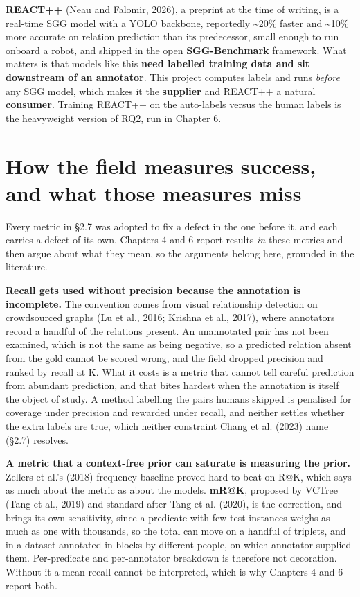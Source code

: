 \textbf{REACT++} (Neau and Falomir, 2026), a preprint at the time of writing, is a real-time SGG model with a YOLO backbone, reportedly \textasciitilde{}20\% faster and \textasciitilde{}10\% more accurate on relation prediction than its predecessor, small enough to run onboard a robot, and shipped in the open \textbf{SGG-Benchmark} framework. What matters is that models like this \textbf{need labelled training data and sit downstream of an annotator}. This project computes labels and runs \textit{before} any SGG model, which makes it the \textbf{supplier} and REACT++ a natural \textbf{consumer}. Training REACT++ on the auto-labels versus the human labels is the heavyweight version of RQ2, run in Chapter 6.

\section{How the field measures success, and what those measures miss}

Every metric in \S{}2.7 was adopted to fix a defect in the one before it, and each carries a defect of its own. Chapters 4 and 6 report results \textit{in} these metrics and then argue about what they mean, so the arguments belong here, grounded in the literature.

\textbf{Recall gets used without precision because the annotation is incomplete.} The convention comes from visual relationship detection on crowdsourced graphs (Lu et al., 2016; Krishna et al., 2017), where annotators record a handful of the relations present. An unannotated pair has not been examined, which is not the same as being negative, so a predicted relation absent from the gold cannot be scored wrong, and the field dropped precision and ranked by recall at K. What it costs is a metric that cannot tell careful prediction from abundant prediction, and that bites hardest when the annotation is itself the object of study. A method labelling the pairs humans skipped is penalised for coverage under precision and rewarded under recall, and neither settles whether the extra labels are true, which neither constraint Chang et al. (2023) name (\S{}2.7) resolves.

\textbf{A metric that a context-free prior can saturate is measuring the prior.} Zellers et al.'s (2018) frequency baseline proved hard to beat on R@K, which says as much about the metric as about the models. \textbf{mR@K}, proposed by VCTree (Tang et al., 2019) and standard after Tang et al. (2020), is the correction, and brings its own sensitivity, since a predicate with few test instances weighs as much as one with thousands, so the total can move on a handful of triplets, and in a dataset annotated in blocks by different people, on which annotator supplied them. Per-predicate and per-annotator breakdown is therefore not decoration. Without it a mean recall cannot be interpreted, which is why Chapters 4 and 6 report both.

